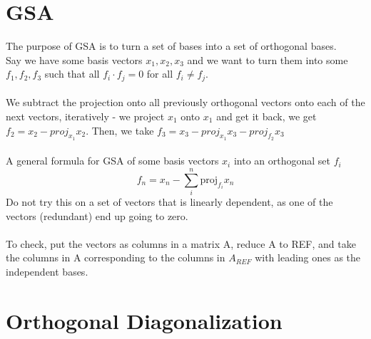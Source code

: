 \documentclass[10pt, twocolumn] {article}
\begin{document}
     \section{GSA}
     The purpose of GSA is to turn a set of bases into a set of orthogonal bases.\\
     Say we have some basis vectors $x_1, x_2, x_3$ and we want to turn them into some $f_1, f_2, f_3$ such that all $f_i \cdot f_j = 0$ for all $f_i \neq f_j$. \\\\We subtract the projection onto all previously orthogonal vectors onto each of the next vectors, iteratively - we project $x_1$ onto $x_1$ and get it back, we get $f_2 = x_2 - proj_{x_1}x_2$. Then, we take $f_3 = x_3 - proj_{x_1}x_3 - proj_{f_2}x_3$ \\\\
     A general formula for GSA of some basis vectors $x_i$ into an orthogonal set $f_i$
     $$f_n = x_n - \sum_i^n \text{proj}_{f_i}x_n$$
     Do not try this on a set of vectors that is linearly dependent, as one of the vectors (redundant) end up going to zero.\\\\ To check, put the vectors as columns in a matrix A, reduce A to REF, and take the columns in A corresponding to the columns in $A_{REF}$ with leading ones as the independent bases.
     \section{Orthogonal Diagonalization}
\end{document}
